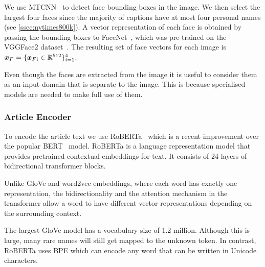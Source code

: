 We use MTCNN~\cite{Zhang2016JointFD} to detect face bounding boxes in the
image. We then select the largest four faces since the majority of captions
have at most four personal names (see \ref{ssec:nytimes800k}). A vector
representation of each face is obtained by passing the bounding boxes to
FaceNet~\cite{Schroff2015FaceNetAU}, which was pre-trained on the VGGFace2
dataset~\cite{Cao2017VGGFace2AD}. The resulting set of face vectors for each
image is $\bm{x}_{F} = \{\bm{x}_{Fi} \in \mathbb{R}^{512}\}_{i=1}^4$.

Even though the faces are extracted from the image it is useful to consider
them as an input domain that is separate to the image. This is because
specialised models are needed to make full use of them.



\subsubsection{Article Encoder}

To encode the article text we use RoBERTa~\cite{Liu2019RoBERTaAR} which is a
recent improvement over the popular BERT~\cite{Devlin2019BERT} model.
RoBERTa is a language representation model that provides pretrained contextual
embeddings for text. It consists of 24 layers of bidirectional transformer
blocks.

Unlike GloVe \cite{Pennington2014Glove} and word2vec
\cite{Mikolov2013DistributedRO} embeddings, where each word has exactly one
representation, the bidirectionality and the attention mechanism in the
transformer allow a word to have different vector representations depending on
the surrounding context.

The largest GloVe model has a vocabulary size of 1.2 million. Although this is
large, many rare names will still get mapped to the unknown token. In contrast,
RoBERTa uses BPE \cite{Sennrich2015NeuralMT,Radford2019LanguageMA} which can
encode any word that can be written in Unicode characters.

